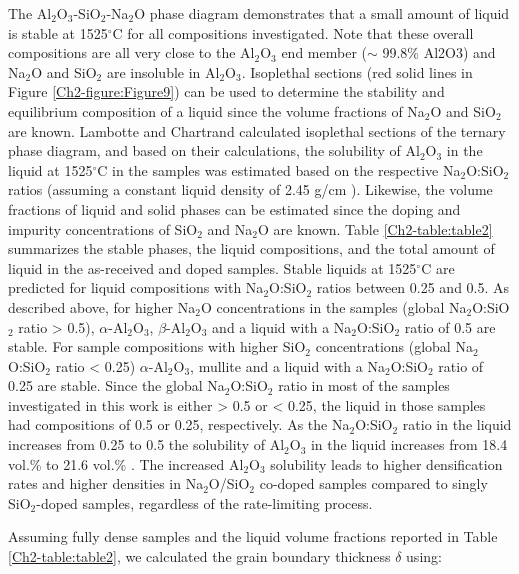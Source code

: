 The Al$_{2}$O$_{3}$-SiO$_{2}$-Na$_{2}$O phase diagram demonstrates that a small amount of liquid is stable at 1525$^{\circ}$C for all compositions investigated. Note that these overall compositions are all very close to the Al$_{2}$O$_{3}$ end member ($\sim$ 99.8\% Al2O3) and Na$_{2}$O and SiO$_{2}$ are insoluble in Al$_{2}$O$_{3}$. Isoplethal sections (red solid lines in Figure \ref{Ch2-figure:Figure9}) can be used to determine the stability and equilibrium composition of a liquid since the volume fractions of Na$_{2}$O and SiO$_{2}$ are known. Lambotte and Chartrand \cite{Lambotte2013} calculated isoplethal sections of the ternary phase diagram, and based on their calculations, the solubility of Al$_{2}$O$_{3}$ in the liquid at 1525$^{\circ}$C in the samples was estimated based on the respective Na$_{2}$O:SiO$_{2}$ ratios (assuming a constant liquid density of 2.45 g/cm \cite{Standard2013,Day1962}). Likewise, the volume fractions of liquid and solid phases can be estimated since the doping and impurity concentrations of SiO$_{2}$ and Na$_{2}$O are known. Table \ref{Ch2-table:table2} summarizes the stable phases, the liquid compositions, and the total amount of liquid in the as-received and doped samples. Stable liquids at 1525$^{\circ}$C are predicted for liquid compositions with Na$_{2}$O:SiO$_{2}$ ratios between 0.25 and 0.5. As described above, for higher Na$_{2}$O concentrations in the samples (global Na$_{2}$O:SiO$_{2}$ ratio > 0.5), $\alpha$-Al$_{2}$O$_{3}$, $\beta$-Al$_{2}$O$_{3}$ and a liquid with a Na$_{2}$O:SiO$_{2}$ ratio of 0.5 are stable. For sample compositions with higher SiO$_{2}$ concentrations (global Na$_{2}$O:SiO$_{2}$ ratio < 0.25) $\alpha$-Al$_{2}$O$_{3}$, mullite and a liquid with a Na$_{2}$O:SiO$_{2}$ ratio of 0.25 are stable. Since the global Na$_{2}$O:SiO$_{2}$ ratio in most of the samples investigated in this work is either > 0.5 or < 0.25, the liquid in those samples had compositions of 0.5 or 0.25, respectively. As the Na$_{2}$O:SiO$_{2}$ ratio in the liquid increases from 0.25 to 0.5 the solubility of Al$_{2}$O$_{3}$ in the liquid increases from 18.4 vol.\% to 21.6 vol.\% \cite{Lambotte2013}. The increased Al$_{2}$O$_{3}$ solubility leads to higher densification rates and higher densities in Na$_{2}$O/SiO$_{2}$ co-doped samples compared to singly SiO$_{2}$-doped samples, regardless of the rate-limiting process. 

Assuming fully dense samples and the liquid volume fractions reported in Table \ref{Ch2-table:table2}, we calculated the grain boundary thickness $\delta$ using:


